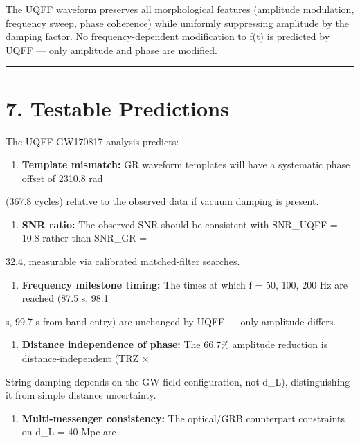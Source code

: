 \documentclass[11pt]{article}
\begin{document}
The UQFF waveform preserves all morphological features (amplitude modulation, frequency sweep, phase coherence) while uniformly suppressing amplitude by the damping factor. No frequency-dependent modification to f(t) is predicted by UQFF --- only amplitude and phase are modified.

\noindent\rule{\textwidth}{0.4pt}

\section*{7. Testable Predictions}

The UQFF GW170817 analysis predicts:

\begin{enumerate}
  \item \textbf{Template mismatch:} GR waveform templates will have a systematic phase offset of 2310.8 rad
\end{enumerate}

(367.8 cycles) relative to the observed data if vacuum damping is present.

\begin{enumerate}
  \item \textbf{SNR ratio:} The observed SNR should be consistent with SNR\_UQFF = 10.8 rather than SNR\_GR =
\end{enumerate}

32.4, measurable via calibrated matched-filter searches.

\begin{enumerate}
  \item \textbf{Frequency milestone timing:} The times at which f = 50, 100, 200 Hz are reached (87.5 s, 98.1
\end{enumerate}

s, 99.7 s from band entry) are unchanged by UQFF --- only amplitude differs.

\begin{enumerate}
  \item \textbf{Distance independence of phase:} The 66.7\% amplitude reduction is distance-independent (TRZ $\times$
\end{enumerate}

String damping depends on the GW field configuration, not d\_L), distinguishing it from simple distance uncertainty.

\begin{enumerate}
  \item \textbf{Multi-messenger consistency:} The optical/GRB counterpart constraints on d\_L = 40 Mpc are
\end{enumerate}
\end{document}
